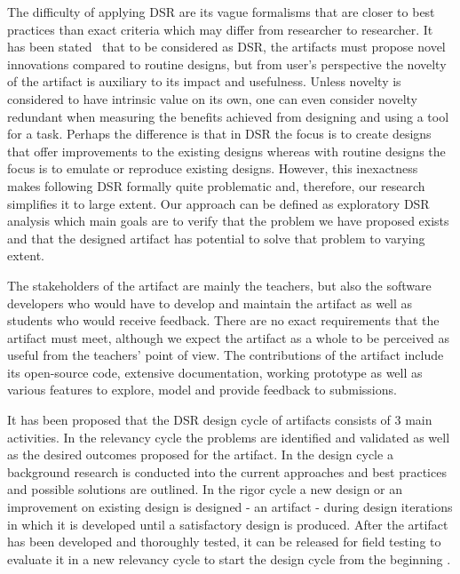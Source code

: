 The difficulty of applying DSR are its vague formalisms that are closer to best practices than exact criteria which may differ from researcher to researcher. It has been stated~\cite{drs-in-is} that to be considered as DSR, the artifacts must propose novel innovations compared to routine designs, but from user's perspective the novelty of the artifact is auxiliary to its impact and usefulness. Unless novelty is considered to have intrinsic value on its own, one can even consider novelty redundant when measuring the benefits achieved from designing and using a tool for a task. Perhaps the difference is that in DSR the focus is to create designs that offer improvements to the existing designs whereas with routine designs the focus is to emulate or reproduce existing designs. However, this inexactness makes following DSR formally quite problematic and, therefore, our research simplifies it to large extent. Our approach can be defined as exploratory DSR analysis which main goals are to verify that the problem we have proposed exists and that the designed artifact has potential to solve that problem to varying extent\cite{drs-drm, drs-in-is}.

The stakeholders of the artifact are mainly the teachers, but also the software developers who would have to develop and maintain the artifact as well as students who would receive feedback. There are no exact requirements that the artifact must meet, although we expect the artifact as a whole to be perceived as useful from the teachers' point of view. The contributions of the artifact include its open-source code, extensive documentation, working prototype as well as various features to explore, model and provide feedback to submissions.

It has been proposed that the DSR design cycle of artifacts consists of 3 main activities. In the relevancy cycle the problems are identified and validated as well as the desired outcomes proposed for the artifact. In the design cycle a background research is conducted into the current approaches and best practices and possible solutions are outlined. In the rigor cycle a new design or an improvement on existing design is designed - an artifact - during design iterations in which it is developed until a satisfactory design is produced. After the artifact has been developed and thoroughly tested, it can be released for field testing to evaluate it in a new relevancy cycle to start the design cycle from the beginning \cite{drs-in-is}.

